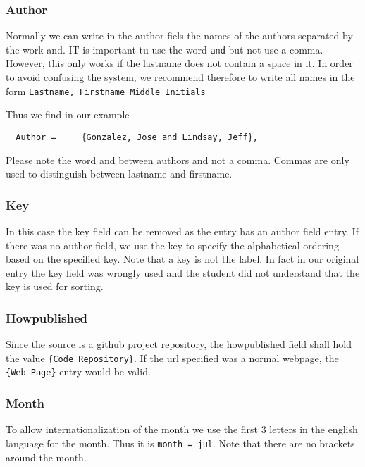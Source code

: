 \subsubsection{Author}\label{s:e:author}

Normally we can write in the author fiels the names of the authors
separated by the work and. IT is important tu use the word \verb|and|
but not use a comma. However, this only works if the lastname does not
contain a space in it. In order to avoid confusing the system, we
recommend therefore to write all names in the form
\verb|Lastname, Firstname Middle Initials|

Thus we find in our example

\verb|  Author =     {Gonzalez, Jose and Lindsay, Jeff},|

\begin{WARNING}
Please note the word and between authors and not a comma. Commas are
only used to distinguish between lastname and firstname.
\end{WARNING}


\subsubsection{Key}\label{s:e:key}

In this case the key field can be removed as the entry has an author
field entry. If there was no author field, we use the key to specify
the alphabetical ordering based on the specified key. Note that a key is
not the label. In fact in our original entry the key field was wrongly
used and the student did not understand that the key is used for
sorting.

\subsubsection{Howpublished}\label{s:e:howpublished}

Since the source is a github project repository, the howpublished field
shall hold the value \verb|{Code Repository}|. If the
url specified was a normal webpage, the \verb|{Web Page}| entry would be
valid.

\subsubsection{Month}\label{s:e:month}

To allow internationalization of the month we use the first 3 letters
in the english language for the month. Thus it is 
\verb|month = jul|. Note that there are no brackets around the month.

